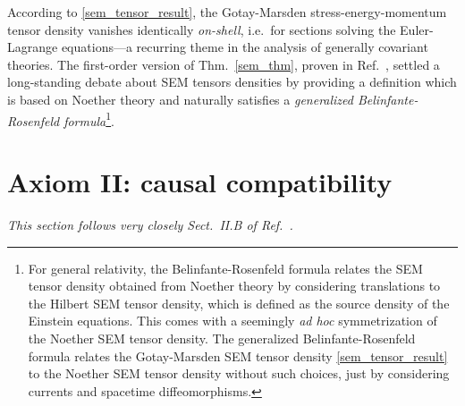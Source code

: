 According to \eqref{sem_tensor_result}, the Gotay-Marsden stress-energy-momentum tensor density vanishes identically \emph{on-shell}, i.e.~for sections solving the Euler-Lagrange equations---a recurring theme in the analysis of generally covariant theories. The first-order version of Thm.~\ref{sem_thm}, proven in Ref.~\cite{goma}, settled a long-standing debate about SEM tensors densities by providing a definition which is based on Noether theory and naturally satisfies a \emph{generalized Belinfante-Rosenfeld formula}\footnote{For general relativity, the Belinfante-Rosenfeld formula\cite{Belinfante,Rosenfeld} relates the SEM tensor density obtained from Noether theory by considering translations to the Hilbert SEM tensor density, which is defined as the source density of the Einstein equations.\cite{GoMa} This comes with a seemingly \emph{ad hoc} symmetrization of the Noether SEM tensor density. The generalized Belinfante-Rosenfeld formula\cite{GoMa} relates the Gotay-Marsden SEM tensor density \eqref{sem_tensor_result} to the Noether SEM tensor density without such choices, just by considering currents and spacetime diffeomorphisms.}.

\section{Axiom II: causal compatibility}
\textit{This section follows very closely Sect.~II.B of Ref.~\cite{ccg paper}.}

